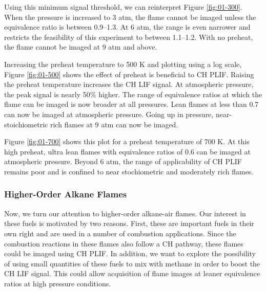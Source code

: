 Using this minimum signal threshold, we can reinterpret Figure \ref{fig:01-300}.
When the pressure is increased to 3 atm, the flame cannot be imaged unless the equivalence ratio is between 0.9--1.3.
At 6 atm, the range is even narrower and restricts the feasibility of this experiment to between 1.1--1.2.
With no preheat, the flame cannot be imaged at 9 atm and above.

Increasing the preheat temperature to 500 K and plotting using a log scale, Figure \ref{fig:01-500} shows the effect of preheat is beneficial to CH PLIF.
Raising the preheat temperature increases the CH LIF signal.
At atmospheric pressure, the peak signal is nearly 50\% higher.
The range of equivalence ratios at which the flame can be imaged is now broader at all pressures.
Lean flames at less than 0.7 can now be imaged at atmospheric pressure.
Going up in pressure, near-stoichiometric rich flames at 9 atm can now be imaged.



Figure \ref{fig:01-700} shows this plot for a preheat temperature of 700 K.
At this high preheat, ultra lean flames with equivalence ratios of 0.6 can be imaged at atmospheric pressure.
Beyond 6 atm, the range of applicability of CH PLIF remains poor and is confined to near stochiometric and moderately rich flames.



\subsubsection{Higher-Order Alkane Flames}
\label{subsubsec:unstrained-higher-alkanes}

Now, we turn our attention to higher-order alkane-air flames.
Our interest in these fuels is motivated by two reasons.
First, these are important fuels in their own right and are used in a number of combustion applications.
Since the combustion reactions in these flames also follow a CH pathway, these flames could be imaged using CH PLIF.
In addition, we want to explore the possibility of using small quantities of these fuels to mix with methane in order to boost the CH LIF signal.
This could allow acquisition of flame images at leaner equivalence ratios at high pressure conditions.

